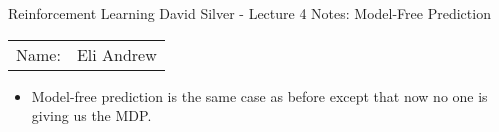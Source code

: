 \documentclass[12pt]{article}
\begin{document}
\begin{center}
{\Large Reinforcement Learning David Silver - Lecture 4 Notes: Model-Free Prediction}

\begin{tabular}{rl}
Name: & Eli Andrew
\end{tabular}
\end{center}

  \begin{itemize}
    \item Model-free prediction is the same case as before except that now no one is giving
    us the MDP. 
  \end{itemize}
\end{document}
